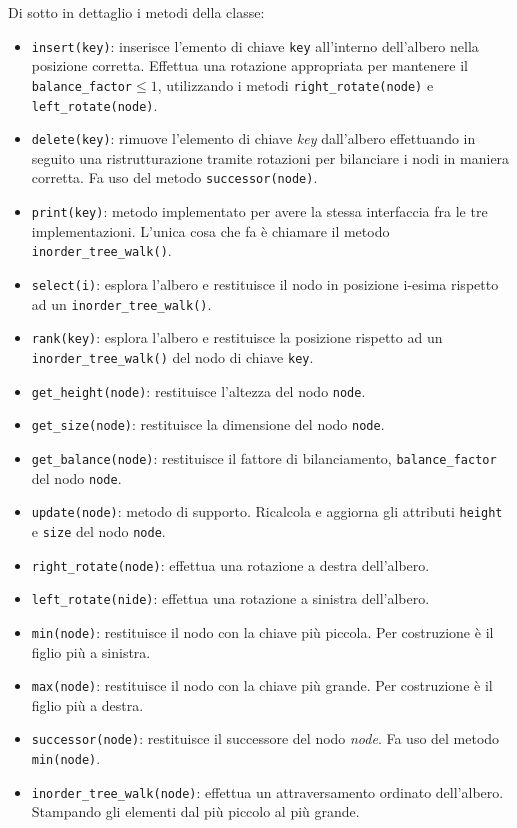 Di sotto in dettaglio i metodi della classe:
\begin{itemize}
	\item \texttt{insert(key)}: inserisce l'emento di chiave \texttt{key} all'interno dell'albero nella posizione corretta. Effettua una rotazione appropriata per mantenere il \texttt{balance\_factor}$\leq 1$, utilizzando i metodi \texttt{right\_rotate(node)} e \texttt{left\_rotate(node)}.
	\item \texttt{delete(key)}: rimuove l'elemento di chiave \textit{key} dall'albero effettuando in seguito una ristrutturazione tramite rotazioni per bilanciare i nodi in maniera corretta. Fa uso del metodo \texttt{successor(node)}.
	\item \texttt{print(key)}: metodo implementato per avere la stessa interfaccia fra le tre implementazioni. L'unica cosa che fa è chiamare il metodo \texttt{inorder\_tree\_walk()}.
	\item \sloppy \texttt{select(i)}: esplora l'albero e restituisce il nodo in posizione i-esima rispetto ad un \texttt{inorder\_tree\_walk()}.
	\item \texttt{rank(key)}: esplora l'albero e restituisce la posizione rispetto ad un \texttt{inorder\_tree\_walk()} del nodo di chiave \texttt{key}.
	\item \texttt{get\_height(node)}: restituisce l'altezza del nodo \texttt{node}.
	\item \texttt{get\_size(node)}: restituisce la dimensione del nodo \texttt{node}.
	\item \texttt{get\_balance(node)}: restituisce il fattore di bilanciamento, \texttt{balance\_factor} del nodo \texttt{node}.
	\item \texttt{update(node)}: metodo di supporto. Ricalcola e aggiorna gli attributi \texttt{height} e \texttt{size} del nodo \texttt{node}.
	\item \texttt{right\_rotate(node)}: effettua una rotazione a destra dell'albero.
	\item \texttt{left\_rotate(nide)}: effettua una rotazione a sinistra dell'albero.
	\item \texttt{min(node)}: restituisce il nodo con la chiave più piccola. Per costruzione è il figlio più a sinistra.
	\item \texttt{max(node)}: restituisce il nodo con la chiave più grande. Per costruzione è il figlio più a destra.
	\item \texttt{successor(node)}: restituisce il successore del nodo \textit{node}. Fa uso del metodo \texttt{min(node)}.
	\item \texttt{inorder\_tree\_walk(node)}: effettua un attraversamento ordinato dell'albero. Stampando gli elementi dal più piccolo al più grande.
\end{itemize}

